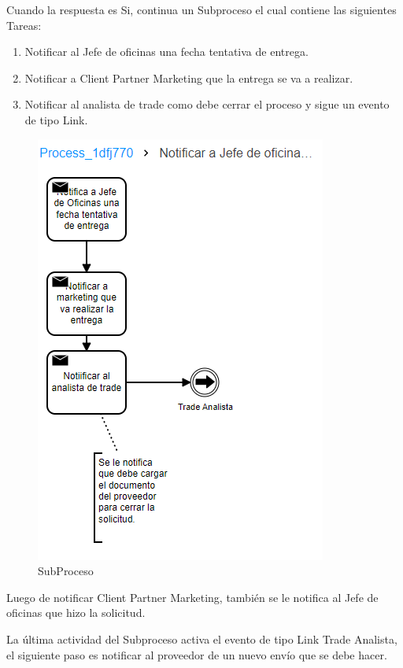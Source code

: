Cuando la respuesta es Si, continua un Subproceso el cual contiene las siguientes Tareas:
\begin{enumerate}
	\item Notificar al Jefe de oficinas una fecha tentativa de entrega.
	\item Notificar a Client Partner Marketing que la entrega se va a realizar.
	\item Notificar al analista de trade como debe cerrar el proceso y sigue un evento de tipo Link.
\end{enumerate}

\begin{figure}[H]
	\centering
	\includegraphics[scale=0.5]{Capitulo4/imagenes/7.png}
	\caption{SubProceso}
	\label{SubP}
\end{figure}

Luego de notificar Client Partner Marketing, también se le notifica al Jefe de oficinas que hizo la solicitud.

La última actividad del Subproceso activa el evento de tipo Link Trade Analista, el siguiente paso es notificar al proveedor de un nuevo envío que se debe hacer.

